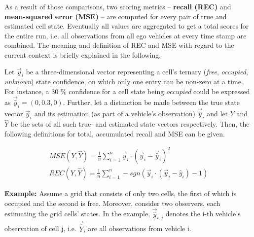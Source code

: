 As a result of those comparisons, two scoring metrics – \textbf{recall (REC)} and \textbf{mean-squared error (MSE)} – are computed for every pair of true and estimated cell state. Eventually all values are aggregated to get a total scores for the entire run, i.e. all observations from all ego vehicles at every time stamp are combined. The meaning and definition of REC and MSE with regard to the current context is briefly explained in the following.
\par
\bigskip

Let $\vec{y}_i$ be a three-dimensional vector representing a cell's ternary (\textit{free}, \textit{occupied}, \textit{unknown}) state confidence, on which only one entry can be non-zero at a time. For instance, a 30 \% confidence for a cell state being \textit{occupied} could be expressed as $\vec{\hat{y}}_i = (0, 0.3, 0)$. Further, let a distinction be made between the true state vector $\vec{y}_i$ and its estimation (as part of a vehicle's observation) $\vec{\hat{y}}_i$ and let $Y$ and $\hat{Y}$ be the sets of all such true- and estimated state vectors respectively. Then, the following definitions for total, accumulated recall and MSE can be given.

\begin{gather}
	\textit{MSE}(Y, \hat{Y}) = \frac{1}{n} \sum_{i=1}^{n} \vec{y}_i \cdot (\vec{y}_i - \vec{\hat{y}}_i)^2 \\
	\textit{REC}(Y, \hat{Y}) = \frac{1}{n} \sum_{i=1}^{n} -\textit{sgn}(\vec{y}_i \cdot (\vec{y}_i - \hat{y}_i) - 1)
\end{gather}

\textbf{Example:} Assume a grid that consists of only two cells, the first of which is occupied and the second is free. Moreover, consider two observers, each estimating the grid cells' states. In the example, $\vec{\hat{y}}_{i,j}$ denotes the i-th vehicle's observation of cell j, i.e. $\vec{\hat{Y}}_i$ are all observations from vehicle i.

